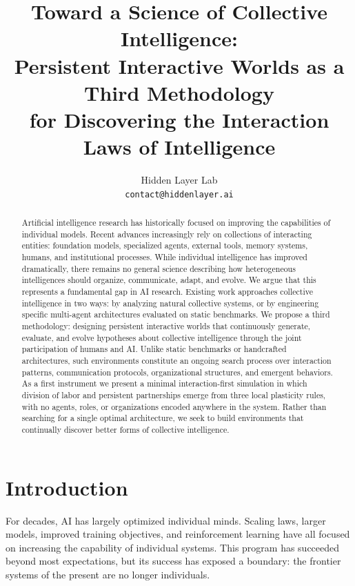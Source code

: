 \documentclass{article}
\title{Toward a Science of Collective Intelligence: \\
Persistent Interactive Worlds as a Third Methodology \\
for Discovering the Interaction Laws of Intelligence}
\author{
  Hidden Layer Lab \\
  \texttt{contact@hiddenlayer.ai}
}
\begin{document}
\maketitle

\begin{abstract}
Artificial intelligence research has historically focused on improving the capabilities of individual models. Recent advances increasingly rely on collections of interacting entities: foundation models, specialized agents, external tools, memory systems, humans, and institutional processes. While individual intelligence has improved dramatically, there remains no general science describing how heterogeneous intelligences should organize, communicate, adapt, and evolve. We argue that this represents a fundamental gap in AI research. Existing work approaches collective intelligence in two ways: by analyzing natural collective systems, or by engineering specific multi-agent architectures evaluated on static benchmarks. We propose a third methodology: designing persistent interactive worlds that continuously generate, evaluate, and evolve hypotheses about collective intelligence through the joint participation of humans and AI. Unlike static benchmarks or handcrafted architectures, such environments constitute an ongoing search process over interaction patterns, communication protocols, organizational structures, and emergent behaviors. As a first instrument we present a minimal interaction-first simulation in which division of labor and persistent partnerships emerge from three local plasticity rules, with no agents, roles, or organizations encoded anywhere in the system. Rather than searching for a single optimal architecture, we seek to build environments that continually discover better forms of collective intelligence.
\end{abstract}

\section{Introduction}

For decades, AI has largely optimized individual minds. Scaling laws, larger models, improved training objectives, and reinforcement learning have all focused on increasing the capability of individual systems. This program has succeeded beyond most expectations, but its success has exposed a boundary: the frontier systems of the present are no longer individuals.
\end{document}
